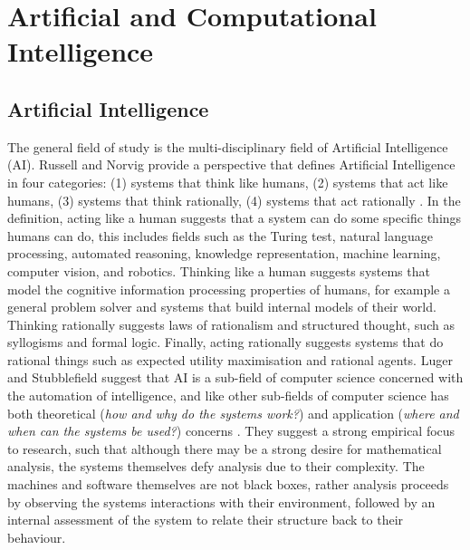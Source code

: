 %
%
\section{Artificial and Computational Intelligence}
\label{sec:aiandci}

%
%
\subsection{Artificial Intelligence}
The general field of study is the multi-disciplinary field of Artificial Intelligence (AI). Russell and Norvig provide a perspective that defines Artificial Intelligence in four categories: (1) systems that think like humans, (2) systems that act like humans, (3) systems that think rationally, (4) systems that act rationally \cite{Russell1995}. In the definition, acting like a human suggests that a system can do some specific things humans can do, this includes fields such as the Turing test, natural language processing, automated reasoning, knowledge representation, machine learning, computer vision, and robotics. Thinking like a human suggests systems that model the cognitive information processing properties of humans, for example a general problem solver and systems that build internal models of their world. Thinking rationally suggests laws of rationalism and structured thought, such as syllogisms and formal logic. Finally, acting rationally suggests systems that do rational things such as expected utility maximisation and rational agents. Luger and Stubblefield suggest that AI is a sub-field of computer science concerned with the automation of intelligence, and like other sub-fields of computer science has both theoretical (\emph{how and why do the systems work?}) and application (\emph{where and when can the systems be used?}) concerns \cite{Luger1997}. They suggest a strong empirical focus to research, such that although there may be a strong desire for mathematical analysis, the systems themselves defy analysis due to their complexity. The machines and software themselves are not black boxes, rather analysis proceeds by observing the systems interactions with their environment, followed by an internal assessment of the system to relate their structure back to their behaviour. 

